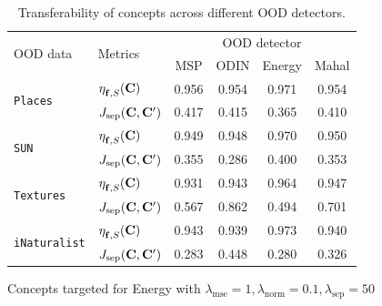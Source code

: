 \begin{table}[htb]
\begin{subtable}{.47\linewidth}
\begin{adjustbox}{width=\textwidth,center}
		\begin{tabular}{l|l|c|c|c|c}
			\toprule
			\multirow{2}{0.35\linewidth}{OOD data} & \multirow{2}{0.06\linewidth}{Metrics} & \multicolumn{4}{c}{OOD detector} \\ \cline{3-6}
    		& & MSP & ODIN & Energy & Mahal\\  \hline \hline
			\multirow{2}{0.08\linewidth}{\texttt{Places}} & $\eta^{}_{\mathbf{f}, S}(\mathbf{C})$ &0.956& 0.954 &0.971 & 0.954\\ 
			& $J_{\textrm{sep}}(\mathbf{C}, \mathbf{C}')$ & 0.417 & 0.415 &0.365& 0.410 \\\hline 
            \multirow{2}{0.08\linewidth}{\texttt{SUN}} & $\eta^{}_{\mathbf{f}, S}(\mathbf{C})$ &0.949& 0.948 &0.970& 0.950\\ 
			& $J_{\textrm{sep}}(\mathbf{C}, \mathbf{C}')$ & 0.355 &0.286 &0.400& 0.353 \\\hline 
			\multirow{2}{0.08\linewidth}{\texttt{Textures}} & $\eta^{}_{\mathbf{f}, S}(\mathbf{C})$ &0.931& 0.943 &0.964& 0.947\\ 
			& $J_{\textrm{sep}}(\mathbf{C}, \mathbf{C}')$ & 0.567 & 0.862&0.494&0.701 \\\hline 
			\multirow{2}{0.08\linewidth}{\texttt{iNaturalist}} & $\eta^{}_{\mathbf{f}, S}(\mathbf{C})$ &0.943& 0.939 &0.973& 0.940\\ 
			& $J_{\textrm{sep}}(\mathbf{C}, \mathbf{C}')$ & 0.283 &0.448 &0.280& 0.326\\
 \bottomrule
		\end{tabular}
   
	\end{adjustbox}
        
        \caption[]{Concepts targeted for Energy with $\lambda_\textrm{mse} = 1, \lambda_\textrm{norm} = 0.1, \lambda_\textrm{sep} = 50$}
	\label{tab:transferability-energy}
 \end{subtable}
\caption{Transferability of concepts across different OOD detectors.}
\end{table}



\fi 


